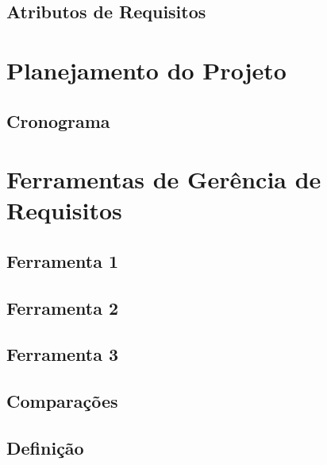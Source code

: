 \section{Atributos de Requisitos}

\chapter[Planejamento do Projeto]{Planejamento do Projeto}
\section{Cronograma}

\chapter[Ferramentas de Gerência de Requisitos]{Ferramentas de Gerência de Requisitos}
\section{Ferramenta 1}
\section{Ferramenta 2}
\section{Ferramenta 3}
\section{Comparações}
\section{Definição}

